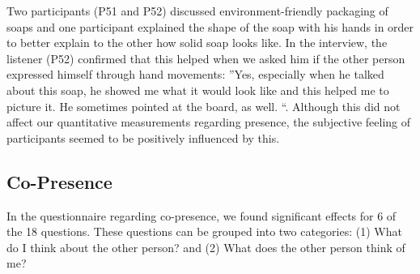 \documentclass[english,runningheads,a4paper]{llncs}[2018/03/10]
\begin{document}
Two participants (P51 and P52) discussed environment-friendly packaging of soaps and one participant explained the shape of the soap with his hands in order to better explain to the other how solid soap looks like. 
In the interview, the listener (P52) confirmed that this helped when we asked him if the other person expressed himself through hand movements: ''Yes, especially when he talked about this soap, he showed me what it would look like and this helped me to picture it. He sometimes pointed at the board, as well. ``.
Although this did not affect our quantitative measurements regarding presence, the subjective feeling of participants seemed to be positively influenced by this. 

\subsection{Co-Presence}
In the questionnaire regarding co-presence, we found significant effects for 6 of the 18 questions.
These questions can be grouped into two categories: (1) What do I think about the other person? and (2) What does the other person think of me?
\end{document}
